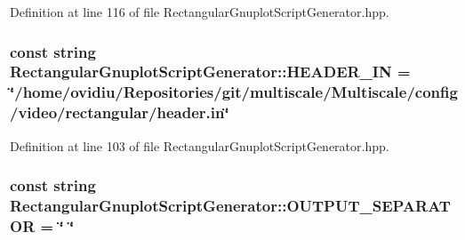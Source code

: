 \-Definition at line 116 of file \-Rectangular\-Gnuplot\-Script\-Generator.\-hpp.

\hypertarget{classmultiscale_1_1video_1_1RectangularGnuplotScriptGenerator_afeced106138e618bb292826093205023}{
\subsubsection[{\-H\-E\-A\-D\-E\-R\-\_\-\-I\-N}]{\setlength{\rightskip}{0pt plus 5cm}const string {\bf \-Rectangular\-Gnuplot\-Script\-Generator\-::\-H\-E\-A\-D\-E\-R\-\_\-\-I\-N} = \char`\"{}/home/ovidiu/\-Repositories/git/multiscale/\-Multiscale/config/video/rectangular/header.\-in\char`\"{}}}\label{classmultiscale_1_1video_1_1RectangularGnuplotScriptGenerator_afeced106138e618bb292826093205023}


\-Definition at line 103 of file \-Rectangular\-Gnuplot\-Script\-Generator.\-hpp.

\hypertarget{classmultiscale_1_1video_1_1RectangularGnuplotScriptGenerator_a8e42e0b2f41ffd1115f6123d45195ed0}{
\subsubsection[{\-O\-U\-T\-P\-U\-T\-\_\-\-S\-E\-P\-A\-R\-A\-T\-O\-R}]{\setlength{\rightskip}{0pt plus 5cm}const string {\bf \-Rectangular\-Gnuplot\-Script\-Generator\-::\-O\-U\-T\-P\-U\-T\-\_\-\-S\-E\-P\-A\-R\-A\-T\-O\-R} = \char`\"{} \char`\"{}}}\label{classmultiscale_1_1video_1_1RectangularGnuplotScriptGenerator_a8e42e0b2f41ffd1115f6123d45195ed0}


